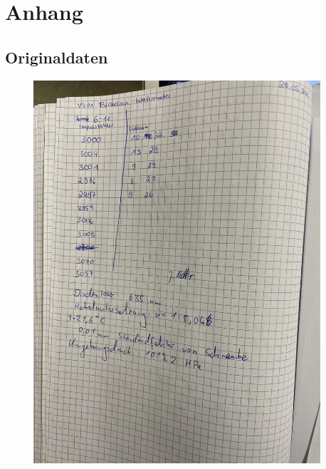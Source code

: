 \section{Anhang}
\label{sec:Anhang}
\subsection{Originaldaten}

\begin{figure}[H]
  \centering
  \includegraphics[width=0.95\textwidth]{content/Messdaten/Messwerte_1.jpg}
  \label{fig:Messungen_1}
\end{figure}
